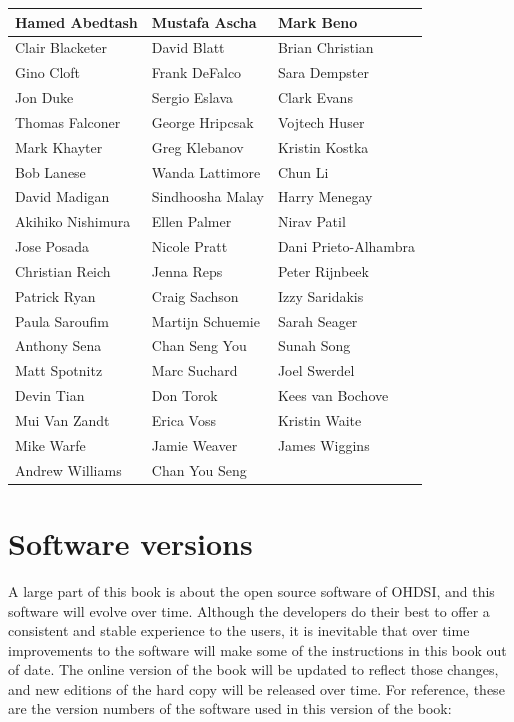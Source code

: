 \documentclass[11pt]{book}
\theoremstyle{definition}
\theoremstyle{definition}
\theoremstyle{definition}
\theoremstyle{remark}
\begin{document}
\begin{center}

\begin{tabular}{l|l|l}
\hline
Hamed Abedtash & Mustafa Ascha & Mark Beno\\
\hline
Clair Blacketer & David Blatt & Brian Christian\\
\hline
Gino Cloft & Frank DeFalco & Sara Dempster\\
\hline
Jon Duke & Sergio Eslava & Clark Evans\\
\hline
Thomas Falconer & George Hripcsak & Vojtech Huser\\
\hline
Mark Khayter & Greg Klebanov & Kristin Kostka\\
\hline
Bob Lanese & Wanda Lattimore & Chun Li\\
\hline
David Madigan & Sindhoosha Malay & Harry Menegay\\
\hline
Akihiko Nishimura & Ellen Palmer & Nirav Patil\\
\hline
Jose Posada & Nicole Pratt & Dani Prieto-Alhambra\\
\hline
Christian Reich & Jenna Reps & Peter Rijnbeek\\
\hline
Patrick Ryan & Craig Sachson & Izzy Saridakis\\
\hline
Paula Saroufim & Martijn Schuemie & Sarah Seager\\
\hline
Anthony Sena & Chan Seng You & Sunah Song\\
\hline
Matt Spotnitz & Marc Suchard & Joel Swerdel\\
\hline
Devin Tian & Don Torok & Kees van Bochove\\
\hline
Mui Van Zandt & Erica Voss & Kristin Waite\\
\hline
Mike Warfe & Jamie Weaver & James Wiggins\\
\hline
Andrew Williams & Chan You Seng & \\
\hline
\end{tabular}
\end{center}

\hypertarget{software-versions}{%
\section*{Software versions}\label{software-versions}}

A large part of this book is about the open source software of OHDSI, and this software will evolve over time. Although the developers do their best to offer a consistent and stable experience to the users, it is inevitable that over time improvements to the software will make some of the instructions in this book out of date. The online version of the book will be updated to reflect those changes, and new editions of the hard copy will be released over time. For reference, these are the version numbers of the software used in this version of the book:
\end{document}
